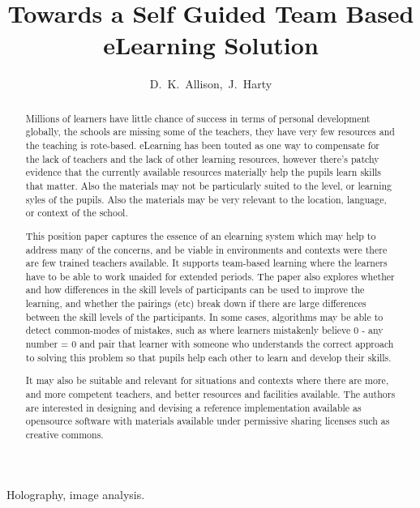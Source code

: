 \documentclass[11pt]{IEEEtran}
\begin{document}
\title{Towards a Self Guided Team Based eLearning Solution}

\author{D.~K.~Allison,~J.~Harty}

\maketitle


\begin{abstract}
Millions of learners have little chance of success in terms of personal 
development globally, the schools are missing some of the teachers, they have 
very few resources and the teaching is rote-based. eLearning has been touted as 
one way to compensate for the lack of teachers and the lack of other learning
resources, however there's patchy evidence that the currently available 
resources materially help the pupils learn skills that matter. Also the 
materials may not be particularly suited to the level, or learning syles of the 
pupils. Also the materials may be very relevant to the location, language, or 
context of the school.

This position paper captures the essence of an elearning system which may help 
to address many of the concerns, and be viable in environments and contexts were
there are few trained teachers available. It supports team-based learning where 
the learners have to be able to work unaided for extended periods. The paper 
also explores whether and how differences in the skill levels of participants 
can be used to improve the learning, and whether the pairings (etc) break down 
if there are large differences between the skill levels of the participants. In 
some cases, algorithms may be able to detect common-modes of mistakes, such as 
where learners mistakenly believe 0 - any number = 0 and pair that learner with 
someone who understands the correct approach to solving this problem so that 
pupils help each other to learn and develop their skills.

It may also be suitable and relevant for situations and contexts where there are
more, and more competent teachers, and better resources and facilities 
available. The authors are interested in designing and devising a reference
implementation available as opensource software with materials available under
permissive sharing licenses such as creative commons.
\end{abstract}

\begin{IEEEkeywords}
Holography, image analysis.
\end{IEEEkeywords}
\end{document}
